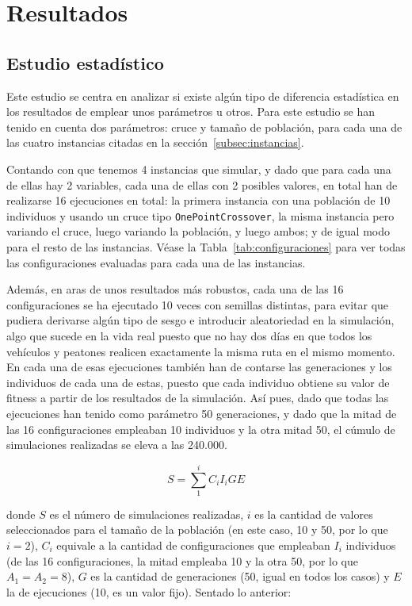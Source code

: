 \chapter{Resultados}
\label{cap:4-resultados}

\section{Estudio estadístico}
\label{subsec:proceso-estudio}

Este estudio se centra en analizar si existe algún tipo de diferencia estadística en los resultados de emplear unos parámetros u otros. Para este estudio se han tenido en cuenta dos parámetros: cruce y tamaño de población, para cada una de las cuatro instancias citadas en la sección~\ref{subsec:instancias}.

Contando con que tenemos 4 instancias que simular, y dado que para cada una de ellas hay 2 variables, cada una de ellas con 2 posibles valores, en total han de realizarse 16 ejecuciones en total: la primera instancia con una población de 10 individuos y usando un cruce tipo \texttt{OnePointCrossover}, la misma instancia pero variando el cruce, luego variando la población, y luego ambos; y de igual modo para el resto de las instancias. Véase la Tabla~\ref{tab:configuraciones} para ver todas las configuraciones evaluadas para cada una de las instancias.

Además, en aras de unos resultados más robustos, cada una de las 16 configuraciones se ha ejecutado 10 veces con semillas distintas, para evitar que pudiera derivarse algún tipo de sesgo e introducir aleatoriedad en la simulación, algo que sucede en la vida real puesto que no hay dos días en que todos los vehículos y peatones realicen exactamente la misma ruta en el mismo momento. En cada una de esas ejecuciones también han de contarse las generaciones y los individuos de cada una de estas, puesto que cada individuo obtiene su valor de fitness a partir de los resultados de la simulación. Así pues, dado que todas las ejecuciones han tenido como parámetro 50 generaciones, y dado que la mitad de las 16 configuraciones empleaban 10 individuos y la otra mitad 50, el cúmulo de simulaciones realizadas se eleva a las 240.000.

$$
S = \sum_{1}^{i} C_i  I_i G E
$$

donde $S$ es el número de simulaciones realizadas, $i$ es la cantidad de valores seleccionados para el tamaño de la población (en este caso, 10 y 50, por lo que $i=2$), $C_i$ equivale a la cantidad de configuraciones que empleaban $I_i$ individuos (de las 16 configuraciones, la mitad empleaba 10 y la otra 50, por lo que $A_1 = A_2 = 8$), $G$ es la cantidad de generaciones (50, igual en todos los casos) y $E$ la de ejecuciones (10, es un valor fijo). Sentado lo anterior:

